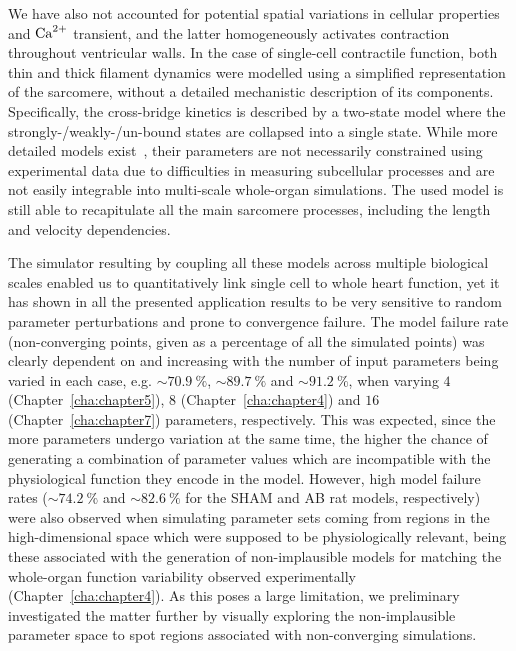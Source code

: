 \vspace{0.2cm}
We have also not accounted for potential spatial variations in cellular properties and $\textrm{Ca}^{2+}$ transient, and the latter homogeneously activates contraction throughout ventricular walls. In the case of single-cell contractile function, both thin and thick filament dynamics were modelled using a simplified representation of the sarcomere, without a detailed mechanistic description of its components. Specifically, the cross-bridge kinetics is described by a two-state model where the strongly-/weakly-/un-bound states are collapsed into a single state. While more detailed models exist~\cite{Land:2015*a}, their parameters are not necessarily constrained using experimental data due to difficulties in measuring subcellular processes and are not easily integrable into multi-scale whole-organ simulations. The used model is still able to recapitulate all the main sarcomere processes, including the length and velocity dependencies.

\vspace{0.2cm}
The simulator resulting by coupling all these models across multiple biological scales enabled us to quantitatively link single cell to whole heart function, yet it has shown in all the presented application results to be very sensitive to random parameter perturbations and prone to convergence failure. The model failure rate (non-converging points, given as a percentage of all the simulated points) was clearly dependent on and increasing with the number of input parameters being varied in each case, e.g. $\sim\SI{70.9}{\percent}$, $\sim\SI{89.7}{\percent}$ and $\sim\SI{91.2}{\percent}$, when varying $4$ (Chapter~\ref{cha:chapter5}), $8$ (Chapter~\ref{cha:chapter4}) and $16$ (Chapter~\ref{cha:chapter7}) parameters, respectively. This was expected, since the more parameters undergo variation at the same time, the higher the chance of generating a combination of parameter values which are incompatible with the physiological function they encode in the model. However, high model failure rates ($\sim\SI{74.2}{\percent}$ and $\sim\SI{82.6}{\percent}$ for the SHAM and AB rat models, respectively) were also observed when simulating parameter sets coming from regions in the high-dimensional space which were supposed to be physiologically relevant, being these associated with the generation of non-implausible models for matching the whole-organ function variability observed experimentally (Chapter~\ref{cha:chapter4}). As this poses a large limitation, we preliminary investigated the matter further by visually exploring the non-implausible parameter space to spot regions associated with non-converging simulations.

